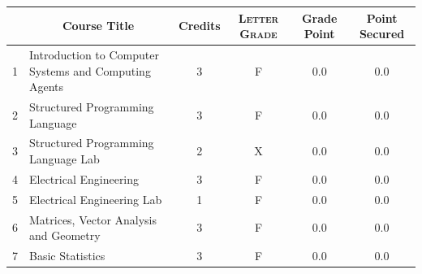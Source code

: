 \documentclass[11pt]{article}
\newcommand*{\numtwo}[1]{\pgfmathprintnumber[
                    fixed, precision=2, fixed zerofill=true]{#1}}
\begin{document}
                \begin{center}
                    \renewcommand{\arraystretch}{1.08}
                    
                \begin{tabular}{|c|l|c|>{\scshape}c|c|c|}
                \hline  \rule[-1ex]{0pt}{3.5ex} {\centering{\bf Course Code}} &  \multicolumn{1}{c|}{\textbf{Course Title}}  & {\bf Credits} & {\bf Letter Grade} & {\bf Grade Point} & {\bf Point Secured}  \\ 
                \hline   1 &  Introduction to Computer Systems and Computing Agents		 & 3 & F & 0.0 & 0.0 \\ %
                \hline   2 &  Structured Programming Language		 & 3 & F & 0.0 & 0.0 \\ %
                \hline   3 &  Structured Programming Language Lab		 & 2 & X & 0.0 & 0.0 \\ %
                \hline   4 &  Electrical Engineering		 & 3 & F & 0.0 & 0.0 \\ %
                \hline   5 &  Electrical Engineering Lab		 & 1 & F & 0.0 & 0.0 \\ %
                \hline   6 &  Matrices, Vector Analysis and Geometry		 & 3 & F & 0.0 & 0.0 \\ %
                \hline   7 &  Basic Statistics		 & 3 & F & 0.0 & 0.0 \\ %

\hline                %
                \end{tabular}
                \end{center}
                \renewcommand{\arraystretch}{1.03}
\end{document}
